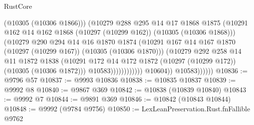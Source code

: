 \begin{lexlean}{RustCore}
\begin{coremodule}
                                        (@10305 (@10306 @1866)))
                                      (@10279
                                        @288
                                        @295
                                        @14
                                        @17
                                        @1868
                                        @1875
                                        (@10291
                                          @162
                                          @14
                                          @162
                                          @1868
                                          (@10297 (@10299 @162))
                                          (@10305 (@10306 @1868)))
                                        (@10279
                                          @290
                                          @294
                                          @14
                                          @16
                                          @1870
                                          @1874
                                          (@10291
                                            @167
                                            @14
                                            @167
                                            @1870
                                            (@10297 (@10299 @167))
                                            (@10305 (@10306 @1870)))
                                          (@10279
                                            @292
                                            @258
                                            @14
                                            @11
                                            @1872
                                            @1838
                                            (@10291
                                              @172
                                              @14
                                              @172
                                              @1872
                                              (@10297 (@10299 @172))
                                              (@10305 (@10306 @1872)))
                                            @10583))))))))))))
                    @10604))
                @10583))))))
@10836 := @9796 @57
@10837 := @9993 @10836
@10838 := @10835 @10837
@10839 := @9992 @8
@10840 := @9867 @369
@10842 := @10838 (@10839 @10840)
@10843 := @9992 @7
@10844 := @9891 @369
@10846 := @10842 (@10843 @10844)
@10848 := @9992 (@9784 @9756)
@10850 := LexLeanPreservation.Rust.fnFallible @9762

\end{coremodule}
\end{lexlean}
